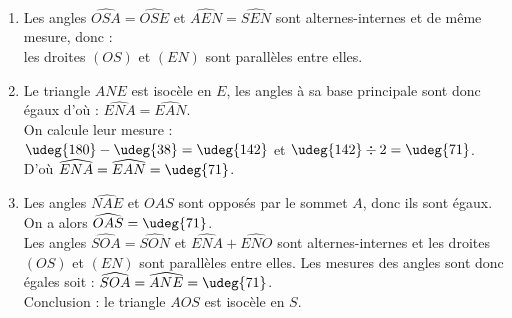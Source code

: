  \ \\ [-5mm]
  \begin{enumerate}
     \item Les angles $\widehat{OSA} =\widehat{OSE}$ et $\widehat{AEN} =\widehat{SEN}$ sont alternes-internes et de même mesure,  donc : \\
        {\red les droites $(OS)$ et $(EN)$ sont parallèles entre elles}.
     \item Le triangle $ANE$ est isocèle en $E$, les angles à sa base principale sont donc égaux d'où : {\red $\widehat{ENA} =\widehat{EAN}$}. \\
        On calcule leur mesure : \\
        $\udeg{180}-\udeg{38} =\udeg{142}$ et $\udeg{142}\div2 =\udeg{71}$. \\
        D'où {\red $\widehat{ENA} =\widehat{EAN} =\udeg{71}$}.
     \item Les angles $\widehat{NAE}$ et $\widehat{OAS}$ sont opposés par le sommet $A$, donc ils sont égaux.\\
        On a alors $\widehat{OAS} =\udeg{71}$. \\
        Les angles $\widehat{SOA} =\widehat{SON}$ et $\widehat{ENA}+\widehat{ENO}$ sont alternes-internes et les droites $(OS)$ et $(EN)$ sont parallèles entre elles. Les mesures des angles sont donc égales soit : $\widehat{SOA} =\widehat{ANE} =\udeg{71}$. \\
       Conclusion : {\red le triangle $AOS$ est isocèle en $S$}.
  \end{enumerate}
